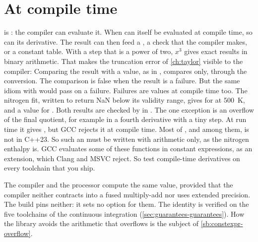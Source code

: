 \section{At compile time}\label{sec:using-constexpr}

 is : the compiler can evaluate it. When  can itself be evaluated at
compile time, so can its derivative. The result can then feed a , a check that the compiler
makes, or a constant table. With a step that is a power of two, $x^3$ gives exact results in binary arithmetic. That
makes the truncation error of \cref{ch:taylor} visible to the compiler:
Comparing the result with a value, as in , compares  only,
through the conversion. The comparison is false when the result is a failure. But the same idiom with \code{!=} would
pass on a failure. Failures are values at compile time too. The nitrogen fit, written to return NaN below its
validity range, gives  for  at \SI{500}{K}, and a value for
. Both results are checked by  in . The one
exception is an overflow of the final quotient, for example in a fourth derivative with a tiny step. At run time it
gives , but GCC rejects it at compile time. Most of ,  and  among
them, is not  in C++23. So such an  must be written with arithmetic only, as the nitrogen
enthalpy is. GCC evaluates some of these functions in constant expressions, as an extension, which Clang and MSVC
reject. So test compile-time derivatives on every toolchain that you ship.

The compiler and the processor compute the same value, provided that the compiler neither contracts
 into a fused multiply-add nor uses extended precision. The build pins neither: it sets no option for them. The identity is verified on the five toolchains of
the continuous integration (\cref{sec:guarantees-guarantees}). How the library avoids the arithmetic that overflows is
the subject of \cref{sb:constexpr-overflow}.

